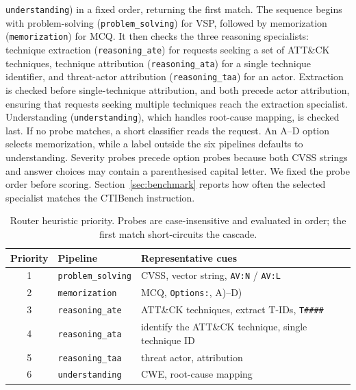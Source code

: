 \documentclass[5p,times,authoryear]{elsarticle}
\begin{document}
\texttt{understanding}) in a fixed order, returning the first match. The sequence begins with problem-solving (\texttt{problem\_solving}) for VSP, followed by memorization (\texttt{memorization}) for MCQ. It then checks the three reasoning specialists: technique extraction (\texttt{reasoning\_ate}) for requests seeking a set of ATT\&CK techniques, technique attribution (\texttt{reasoning\_ata}) for a single technique identifier, and threat-actor attribution (\texttt{reasoning\_taa}) for an actor. Extraction is checked before single-technique attribution, and both precede actor attribution, ensuring that requests seeking multiple techniques reach the extraction specialist. Understanding (\texttt{understanding}), which handles root-cause mapping, is checked last. If no probe matches, a short classifier reads the request. An A--D option selects memorization, while a label outside the six pipelines defaults to understanding. Severity probes precede option probes because both CVSS strings and answer choices may contain a parenthesised capital letter. We fixed the probe order before scoring. Section~\ref{sec:benchmark} reports how often the selected specialist matches the CTIBench instruction.


\begin{table}[t]
\centering
\caption{Router heuristic priority. Probes are case-insensitive and evaluated in order; the first match short-circuits the cascade.}
\label{tab:router-heuristics}
\small
\begin{tabular}{@{}clp{}@{}}
\toprule
Priority & Pipeline & Representative cues \\
\midrule
1 & \texttt{problem\_solving} & CVSS, vector string, \texttt{AV:N} / \texttt{AV:L} \\
2 & \texttt{memorization} & MCQ, \texttt{Options:}, A)--D) \\
3 & \texttt{reasoning\_ate} & ATT\&CK techniques, extract T-IDs, \texttt{T\#\#\#\#} \\
4 & \texttt{reasoning\_ata} & identify the ATT\&CK technique, single technique ID \\
5 & \texttt{reasoning\_taa} & threat actor, attribution \\
6 & \texttt{understanding} & CWE, root-cause mapping \\
\bottomrule
\end{tabular}
\end{table}
\end{document}
